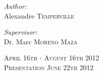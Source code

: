 \begin{titlepage}
\begin{center}
\begin{minipage}{0.4\textwidth}
\begin{flushleft} \large
\emph{Author:}\\
Alexandre \textsc{Temperville}
\end{flushleft}
\end{minipage}
\begin{minipage}{0.4\textwidth}
\begin{flushright} \large
\emph{Supervisor:} \\
Dr. Marc \textsc{Moreno Maza}
\end{flushright}
\end{minipage}

\vfill

\textsc{{\large April 16th - August 16th 2012}}\\
\textsc{{\large Presentation June 22th 2012}}\\


\end{center}

\end{titlepage}
